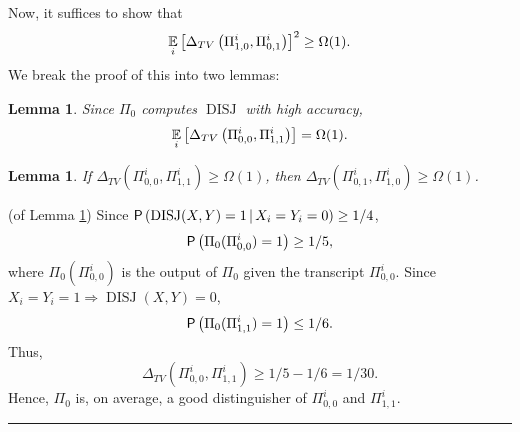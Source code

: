 \documentclass[twoside]{article}
\newcounter{tnum}
\newtheorem{lemma}[tnum]{Lemma}
\newenvironment{proof}{{\bf Proof:}}{\hfill\rule{2mm}{2mm}}
\newcommand\pr{\operatornamewithlimits{\mathsf{P}}}
\newcommand\E{\operatornamewithlimits{\mathbb{E}}}
\newcommand\disj{\operatorname{DISJ}}
\begin{document}
Now, it suffices to show that
\[ \E_i \left[ \Delta_{TV} \left( \Pi_{1,0}^i, \Pi_{0,1}^i \right) \right]^2
    \geq \Omega(1).\]
We break the proof of this into two lemmas:
\begin{lemma}
Since $\Pi_0$ computes $\disj$ with high accuracy,
\[\E_i \left[ \Delta_{TV} \left( \Pi_{0,0}^i, \Pi_{1,1}^i \right) \right]
    = \Omega(1).\]
\label{ACC}
\end{lemma}
\vspace{-0.5in}
\begin{lemma}
If $\Delta_{TV} \left( \Pi_{0,0}^i, \Pi_{1,1}^i \right) \geq \Omega(1)$,
then
$\Delta_{TV} \left( \Pi_{0,1}^i, \Pi_{1,0}^i \right) \geq \Omega(1)$.
\label{RP}
\end{lemma}
\begin{proof}
(of Lemma \ref{ACC})
Since $\pr\left( \disj(X,Y) = 1 \, | \, X_i = Y_i = 0 \right) \geq 1/4$,
\[\pr \left( \Pi_0(\Pi_{0,0}^i) = 1 \right) \geq 1/5,\]
where $\Pi_0(\Pi_{0,0}^i)$ is the output of $\Pi_0$ given the transcript
$\Pi_{0,0}^i$. Since $X_i = Y_i = 1 \Rightarrow \disj(X,Y) = 0$,
\[\pr \left( \Pi_0(\Pi_{1,1}^i) = 1 \right) \leq 1/6.\]
Thus, \[\Delta_{TV} (\Pi_{0,0}^i, \Pi_{1,1}^i) \geq 1/5 - 1/6 = 1/30.\]
Hence, $\Pi_0$ is, on average, a good distinguisher of $\Pi_{0,0}^i$ and
$\Pi_{1,1}^i$.
\end{proof}
\newpage
\end{document}
